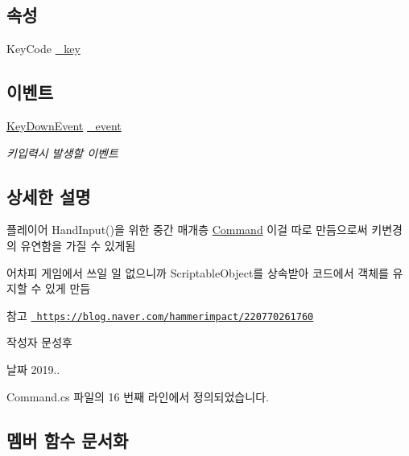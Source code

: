 \subsection*{속성}
\begin{DoxyCompactItemize}
\item 
Key\+Code \mbox{\hyperlink{class_command_a85e9adc5f9994f8da6b21bbad6dfb13d}{\+\_\+key}}
\end{DoxyCompactItemize}
\subsection*{이벤트}
\begin{DoxyCompactItemize}
\item 
\mbox{\hyperlink{class_command_acc714b5e0de57b7f24b2619fff860b9d}{Key\+Down\+Event}} \mbox{\hyperlink{class_command_a04f1a7e0dc8e999e0fca2aa9210f73a3}{\+\_\+event}}
\begin{DoxyCompactList}\small\item\em 키입력시 발생할 이벤트 \end{DoxyCompactList}\end{DoxyCompactItemize}


\subsection{상세한 설명}
플레이어 Hand\+Input()을 위한 중간 매개층 \mbox{\hyperlink{class_command}{Command}} 이걸 따로 만듬으로써 키변경의 유연함을 가질 수 있게됨 

어차피 게임에서 쓰일 일 없으니까 Scriptable\+Object를 상속받아 코드에서 객체를 유지할 수 있게 만듬 \begin{DoxySeeAlso}{참고}
\href{https://blog.naver.com/hammerimpact/220770261760}{\texttt{ https\+://blog.\+naver.\+com/hammerimpact/220770261760}} 
\end{DoxySeeAlso}
\begin{DoxyAuthor}{작성자}
문성후 
\end{DoxyAuthor}
\begin{DoxyDate}{날짜}
2019.. 
\end{DoxyDate}


Command.\+cs 파일의 16 번째 라인에서 정의되었습니다.



\subsection{멤버 함수 문서화}
\mbox{\label{class_command_aae2d7670c9ee25e629d3702579416095}} 
